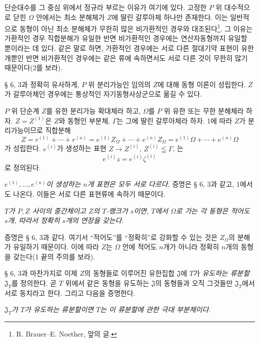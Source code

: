 단순대수를 그 중심 위에서 정규라 부르는 이유가 여기에 있다. 고정한 \(P\) 위 대수적으로 닫힌 \(\Omega\) 안에서는 최소 분해체가 \(Z\)에 딸린 갈루아체 하나만 존재한다. 이는 일반적으로 동형이 아닌 최소 분해체가 무한히 많은 비가환적인 경우와 대조된다\footnote{R. Brauer--E. Noether, 앞의 글.}. 그 이유는 가환적인 경우 직합분해가 유일한 반면 비가환적인 경우에는 연산자동형까지 유일할 뿐이라는 데 있다. 같은 말로 하면, 가환적인 경우에는 서로 다른 절대기약 표현이 유한개뿐인 반면 비가환적인 경우에는 같은 류에 속하면서도 서로 다른 것이 무한히 많기 때문이다(2를 보라).

\medskip
\noindent\textbf{}\quad § 6, 3과 정확히 유사하게, \(P\) 위 분리가능인 임의의 \(Z\)에 대해 동형 이론이 성립한다. \(Z\)가 갈루아체인 경우에는 통상적인 자기동형사상군으로 옮길 수 있다.

\medskip
\noindent\textbf{}\quad \(P\) 위 단순계 \(Z\)를 유한 분리가능 확대체라 하고, \(\Omega\)를 \(P\) 위 유한 또는 무한 분해체라 하자. \(Z=Z^{(1)}\)은 \(Z\)와 동형인 부분체, \(\Gamma\)는 그에 딸린 갈루아체라 하자. 1에 따라 \(Z\)가 분리가능이므로 직합분해
\[
Z=r^{(1)}+\cdots+r^{(n)}
=e^{(1)}Z_\Omega+\cdots+e^{(n)}Z_\Omega
=e^{(1)}\Omega+\cdots+e^{(n)}\Omega
\]
가 성립한다. \(e^{(i)}\)가 생성하는 표현 \(Z\to Z^{(i)}\), \(Z^{(i)}\leqq\Gamma\), 는
\[
e^{(i)}z=e^{(i)}\zeta^{(i)}
\]
로 정의된다.

\noindent\textbf{} \emph{\(e^{(1)},\ldots,e^{(n)}\)이 생성하는 \(n\)개 표현은 모두 서로 다르다.} 증명은 § 6, 3과 같고, 1에서도 나온다. 이들은 서로 다른 표현류에 속하기 때문이다.

\noindent\textbf{} \emph{\(T\)가 \(P,Z\) 사이의 중간체이고 \(Z\)의 \(T\)-랭크가 \(s\)이면, \(T\)에서 \(\Omega\)로 가는 각 동형은 적어도 \(s\)개, 따라서 정확히 \(s\)개의 연장을 갖는다.}

증명은 § 6, 3과 같다. 여기서 “적어도”를 “정확히”로 강화할 수 있는 것은 \(Z_\Omega\)의 분해가 유일하기 때문이다. 이에 따라 \(Z\)는 \(\Omega\) 안에 적어도 \(n\)개가 아니라 정확히 \(n\)개의 동형을 갖는다(1 끝의 주의를 보라).

§ 6, 3과 마찬가지로 이제 \(Z\)의 동형들로 이루어진 유한집합 \(\mathfrak J\)에 \(T\)가 \emph{유도하는 류분할} \(\mathfrak J_T\)를 정의한다. 곧 \(T\) 위에서 같은 동형을 유도하는 \(\mathfrak J\)의 동형들과 오직 그것들만 \(\mathfrak J_T\)에서 서로 동치라고 한다. 그리고 다음을 증명한다.

\noindent\textbf{} \emph{\(\mathfrak J_T\)가 \(T\)가 유도하는 류분할이면 \(T\)는 이 류분할에 관한 극대 부분체이다.}

